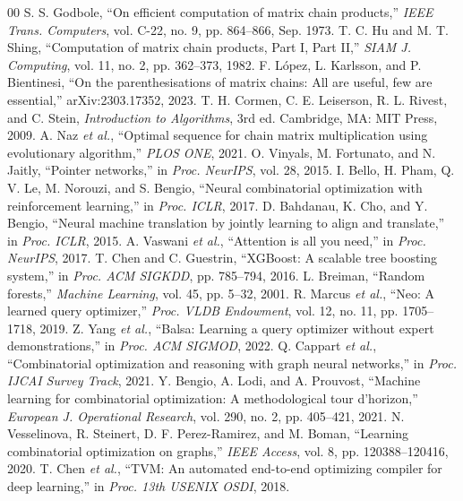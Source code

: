 \documentclass[conference]{IEEEtran}
\begin{document}
\begin{thebibliography}{00}
 S. S. Godbole, ``On efficient computation of matrix chain products,'' \emph{IEEE Trans. Computers}, vol. C-22, no. 9, pp. 864--866, Sep. 1973.
 T. C. Hu and M. T. Shing, ``Computation of matrix chain products, Part I, Part II,'' \emph{SIAM J. Computing}, vol. 11, no. 2, pp. 362--373, 1982.
 F. L\'opez, L. Karlsson, and P. Bientinesi, ``On the parenthesisations of matrix chains: All are useful, few are essential,'' arXiv:2303.17352, 2023.
 T. H. Cormen, C. E. Leiserson, R. L. Rivest, and C. Stein, \emph{Introduction to Algorithms}, 3rd ed. Cambridge, MA: MIT Press, 2009.
 A. Naz \emph{et al.}, ``Optimal sequence for chain matrix multiplication using evolutionary algorithm,'' \emph{PLOS ONE}, 2021.
 O. Vinyals, M. Fortunato, and N. Jaitly, ``Pointer networks,'' in \emph{Proc. NeurIPS}, vol. 28, 2015.
 I. Bello, H. Pham, Q. V. Le, M. Norouzi, and S. Bengio, ``Neural combinatorial optimization with reinforcement learning,'' in \emph{Proc. ICLR}, 2017.
 D. Bahdanau, K. Cho, and Y. Bengio, ``Neural machine translation by jointly learning to align and translate,'' in \emph{Proc. ICLR}, 2015.
 A. Vaswani \emph{et al.}, ``Attention is all you need,'' in \emph{Proc. NeurIPS}, 2017.
 T. Chen and C. Guestrin, ``XGBoost: A scalable tree boosting system,'' in \emph{Proc. ACM SIGKDD}, pp. 785--794, 2016.
 L. Breiman, ``Random forests,'' \emph{Machine Learning}, vol. 45, pp. 5--32, 2001.
 R. Marcus \emph{et al.}, ``Neo: A learned query optimizer,'' \emph{Proc. VLDB Endowment}, vol. 12, no. 11, pp. 1705--1718, 2019.
 Z. Yang \emph{et al.}, ``Balsa: Learning a query optimizer without expert demonstrations,'' in \emph{Proc. ACM SIGMOD}, 2022.
 Q. Cappart \emph{et al.}, ``Combinatorial optimization and reasoning with graph neural networks,'' in \emph{Proc. IJCAI Survey Track}, 2021.
 Y. Bengio, A. Lodi, and A. Prouvost, ``Machine learning for combinatorial optimization: A methodological tour d'horizon,'' \emph{European J. Operational Research}, vol. 290, no. 2, pp. 405--421, 2021.
 N. Vesselinova, R. Steinert, D. F. Perez-Ramirez, and M. Boman, ``Learning combinatorial optimization on graphs,'' \emph{IEEE Access}, vol. 8, pp. 120388--120416, 2020.
 T. Chen \emph{et al.}, ``TVM: An automated end-to-end optimizing compiler for deep learning,'' in \emph{Proc. 13th USENIX OSDI}, 2018.

\end{thebibliography}
\end{document}
